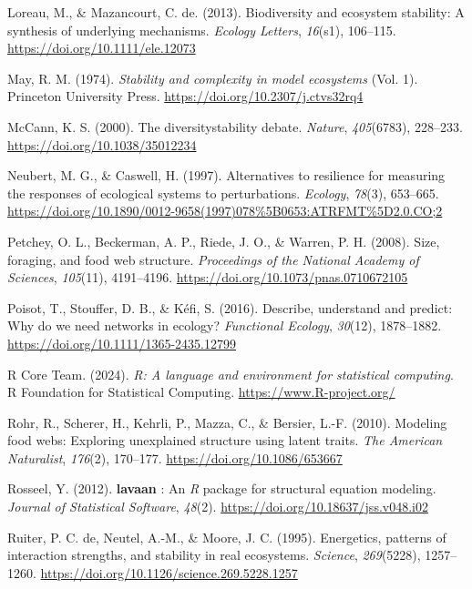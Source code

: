 \documentclass[
]{article}
\newlength{\cslhangindent}
\newenvironment{CSLReferences}[2] %
 {\begin{list}{}{%
  \setlength{\itemindent}{0pt}
  \setlength{\leftmargin}{0pt}
  \setlength{\parsep}{0pt}
  \ifodd #1
   \setlength{\leftmargin}{\cslhangindent}
   \setlength{\itemindent}{-1\cslhangindent}
  \fi
  \setlength{\itemsep}{#2\baselineskip}}}
 {\end{list}}
\begin{document}
\begin{CSLReferences}{1}{0}
Loreau, M., \& Mazancourt, C. de. (2013). Biodiversity and ecosystem
stability: A synthesis of underlying mechanisms. \emph{Ecology Letters},
\emph{16}(s1), 106--115. \url{https://doi.org/10.1111/ele.12073}

May, R. M. (1974). \emph{Stability and complexity in model ecosystems}
(Vol. 1). Princeton University Press.
\url{https://doi.org/10.2307/j.ctvs32rq4}

McCann, K. S. (2000). The diversity{\textendash}stability debate.
\emph{Nature}, \emph{405}(6783), 228--233.
\url{https://doi.org/10.1038/35012234}

Neubert, M. G., \& Caswell, H. (1997). Alternatives to resilience for
measuring the responses of ecological systems to perturbations.
\emph{Ecology}, \emph{78}(3), 653--665.
\url{https://doi.org/10.1890/0012-9658(1997)078\%5B0653:ATRFMT\%5D2.0.CO;2}

Petchey, O. L., Beckerman, A. P., Riede, J. O., \& Warren, P. H. (2008).
Size, foraging, and food web structure. \emph{Proceedings of the
National Academy of Sciences}, \emph{105}(11), 4191--4196.
\url{https://doi.org/10.1073/pnas.0710672105}

Poisot, T., Stouffer, D. B., \& Kéfi, S. (2016). Describe, understand
and predict: Why do we need networks in ecology? \emph{Functional
Ecology}, \emph{30}(12), 1878--1882.
\url{https://doi.org/10.1111/1365-2435.12799}

R Core Team. (2024). \emph{R: A language and environment for statistical
computing}. R Foundation for Statistical Computing.
\url{https://www.R-project.org/}

Rohr, R., Scherer, H., Kehrli, P., Mazza, C., \& Bersier, L.-F. (2010).
Modeling food webs: Exploring unexplained structure using latent traits.
\emph{The American Naturalist}, \emph{176}(2), 170--177.
\url{https://doi.org/10.1086/653667}

Rosseel, Y. (2012). {\textbf{lavaan}} : An {\emph{R}} package for
structural equation modeling. \emph{Journal of Statistical Software},
\emph{48}(2). \url{https://doi.org/10.18637/jss.v048.i02}

Ruiter, P. C. de, Neutel, A.-M., \& Moore, J. C. (1995). Energetics,
patterns of interaction strengths, and stability in real ecosystems.
\emph{Science}, \emph{269}(5228), 1257--1260.
\url{https://doi.org/10.1126/science.269.5228.1257}


\end{CSLReferences}
\end{document}
